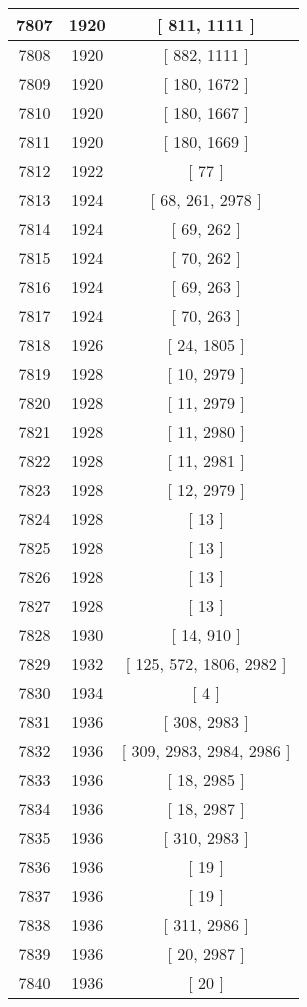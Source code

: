 \begin{center}
\begin{longtable}[H]{|| c c c ||}
\hline
7807 & 1920 & [ 811, 1111 ] \\ 
\hline
7808 & 1920 & [ 882, 1111 ] \\ 
\hline
7809 & 1920 & [ 180, 1672 ] \\ 
\hline
7810 & 1920 & [ 180, 1667 ] \\ 
\hline
7811 & 1920 & [ 180, 1669 ] \\ 
\hline
7812 & 1922 & [ 77 ] \\ 
\hline
7813 & 1924 & [ 68, 261, 2978 ] \\ 
\hline
7814 & 1924 & [ 69, 262 ] \\ 
\hline
7815 & 1924 & [ 70, 262 ] \\ 
\hline
7816 & 1924 & [ 69, 263 ] \\ 
\hline
7817 & 1924 & [ 70, 263 ] \\ 
\hline
7818 & 1926 & [ 24, 1805 ] \\ 
\hline
7819 & 1928 & [ 10, 2979 ] \\ 
\hline
7820 & 1928 & [ 11, 2979 ] \\ 
\hline
7821 & 1928 & [ 11, 2980 ] \\ 
\hline
7822 & 1928 & [ 11, 2981 ] \\ 
\hline
7823 & 1928 & [ 12, 2979 ] \\ 
\hline
7824 & 1928 & [ 13 ] \\ 
\hline
7825 & 1928 & [ 13 ] \\ 
\hline
7826 & 1928 & [ 13 ] \\ 
\hline
7827 & 1928 & [ 13 ] \\ 
\hline
7828 & 1930 & [ 14, 910 ] \\ 
\hline
7829 & 1932 & [ 125, 572, 1806, 2982 ] \\ 
\hline
7830 & 1934 & [ 4 ] \\ 
\hline
7831 & 1936 & [ 308, 2983 ] \\ 
\hline
7832 & 1936 & [ 309, 2983, 2984, 2986 ] \\ 
\hline
7833 & 1936 & [ 18, 2985 ] \\ 
\hline
7834 & 1936 & [ 18, 2987 ] \\ 
\hline
7835 & 1936 & [ 310, 2983 ] \\ 
\hline
7836 & 1936 & [ 19 ] \\ 
\hline
7837 & 1936 & [ 19 ] \\ 
\hline
7838 & 1936 & [ 311, 2986 ] \\ 
\hline
7839 & 1936 & [ 20, 2987 ] \\ 
\hline
7840 & 1936 & [ 20 ] \\ 

\end{longtable}
\end{center}

